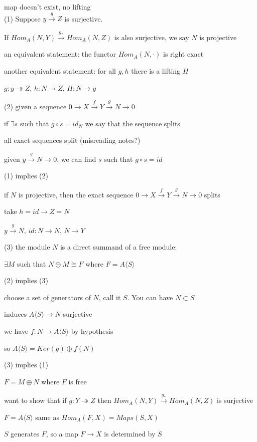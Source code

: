 \documentclass[12pt]{article}
\begin{document}
map doesn't exist, no lifting\\

\noindent
(1) Suppose $y \xrightarrow{g} Z$ is surjective.

If $Hom_A(N, Y) \xrightarrow{g_*} Hom_A(N, Z)$ is also surjective, we say $N$ is projective

an equivalent statement: the functor $Hom_A(N, \cdot)$ is right exact

another equivalent statement: for all $g, h$ there is a lifting $H$

$g: y \twoheadrightarrow Z$, $h: N \to Z$, $H: N \to y$

\noindent
(2) given a sequence $0 \to X \xrightarrow{f} Y \xrightarrow{g} N \to 0$

if $\exists s$ such that $g \circ s = id_N$ we say that the sequence splits

all exact sequences split (misreading notes?)

given $y \xrightarrow{g} N \to 0$, we can find $s$ such that $g \circ s = id$

\noindent
(1) implies (2)

if $N$ is projective, then the exact sequence $0 \to X \xrightarrow{f} Y \xrightarrow{g} N \to 0$ splits

take $h = id \to Z = N$

$y \xrightarrow{g} N$, $id: N \to N$, $N \to Y$

\noindent
(3) the module $N$ is a direct summand of a free module:

$\exists M$ such that $N \oplus M \cong F$ where $F = A\langle S \rangle$

\noindent
(2) implies (3)

choose a set of generators of $N$, call it $S$.  You can have $N \subset S$

induces $A\langle S \rangle \to N$ surjective

we have $f: N \to A\langle S\rangle$ by hypothesis

so $A\langle S\rangle = Ker(g) \oplus f(N)$

\noindent
(3) implies (1)

$F = M \oplus N$ where $F$ is free

want to show that if $g: Y \twoheadrightarrow Z$ then $Hom_A(N, Y) \xrightarrow{g_*} Hom_A(N, Z)$ is surjective

$F = A\langle S \rangle$ same as $Hom_A(F, X) = Maps(S, X)$

$S$ generates $F$, so a map $F \to X$ is determined by $S$
\end{document}
